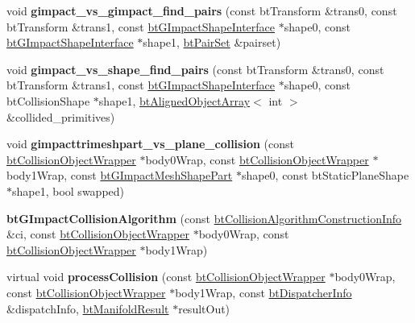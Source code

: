 \begin{DoxyCompactItemize}
void {\bfseries gimpact\+\_\+vs\+\_\+gimpact\+\_\+find\+\_\+pairs} (const bt\+Transform \&trans0, const bt\+Transform \&trans1, const \hyperlink{classbtGImpactShapeInterface}{bt\+G\+Impact\+Shape\+Interface} $\ast$shape0, const \hyperlink{classbtGImpactShapeInterface}{bt\+G\+Impact\+Shape\+Interface} $\ast$shape1, \hyperlink{classbtPairSet}{bt\+Pair\+Set} \&pairset)
\item 
\mbox{\label{classbtGImpactCollisionAlgorithm_a0e70c6b89a8b9295a6bc63365bbaa12e}} 
void {\bfseries gimpact\+\_\+vs\+\_\+shape\+\_\+find\+\_\+pairs} (const bt\+Transform \&trans0, const bt\+Transform \&trans1, const \hyperlink{classbtGImpactShapeInterface}{bt\+G\+Impact\+Shape\+Interface} $\ast$shape0, const bt\+Collision\+Shape $\ast$shape1, \hyperlink{classbtAlignedObjectArray}{bt\+Aligned\+Object\+Array}$<$ int $>$ \&collided\+\_\+primitives)
\item 
\mbox{\label{classbtGImpactCollisionAlgorithm_a3b23f83487de9f2396aff733ad68cea4}} 
void {\bfseries gimpacttrimeshpart\+\_\+vs\+\_\+plane\+\_\+collision} (const \hyperlink{structbtCollisionObjectWrapper}{bt\+Collision\+Object\+Wrapper} $\ast$body0\+Wrap, const \hyperlink{structbtCollisionObjectWrapper}{bt\+Collision\+Object\+Wrapper} $\ast$body1\+Wrap, const \hyperlink{classbtGImpactMeshShapePart}{bt\+G\+Impact\+Mesh\+Shape\+Part} $\ast$shape0, const bt\+Static\+Plane\+Shape $\ast$shape1, bool swapped)
\item 
\mbox{\label{classbtGImpactCollisionAlgorithm_a38256a591aae44ccd30d4b1891d1c355}} 
{\bfseries bt\+G\+Impact\+Collision\+Algorithm} (const \hyperlink{structbtCollisionAlgorithmConstructionInfo}{bt\+Collision\+Algorithm\+Construction\+Info} \&ci, const \hyperlink{structbtCollisionObjectWrapper}{bt\+Collision\+Object\+Wrapper} $\ast$body0\+Wrap, const \hyperlink{structbtCollisionObjectWrapper}{bt\+Collision\+Object\+Wrapper} $\ast$body1\+Wrap)
\item 
\mbox{\label{classbtGImpactCollisionAlgorithm_a2265c46c10120dc0b83b5d6f2de46ae3}} 
virtual void {\bfseries process\+Collision} (const \hyperlink{structbtCollisionObjectWrapper}{bt\+Collision\+Object\+Wrapper} $\ast$body0\+Wrap, const \hyperlink{structbtCollisionObjectWrapper}{bt\+Collision\+Object\+Wrapper} $\ast$body1\+Wrap, const \hyperlink{structbtDispatcherInfo}{bt\+Dispatcher\+Info} \&dispatch\+Info, \hyperlink{classbtManifoldResult}{bt\+Manifold\+Result} $\ast$result\+Out)

\end{DoxyCompactItemize}
